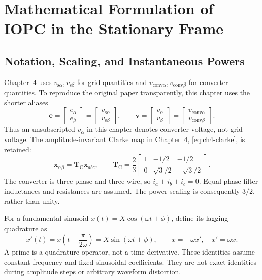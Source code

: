\section{Mathematical Formulation of IOPC in the Stationary Frame}
\label{sec:ch5-iopc}
\subsection{Notation, Scaling, and Instantaneous Powers}
Chapter~4 uses $v_{\mathrm{s}\alpha},v_{\mathrm{s}\beta}$ for grid quantities and $v_{\mathrm{conv}\alpha},v_{\mathrm{conv}\beta}$ for converter quantities. To reproduce the original paper transparently, this chapter uses the shorter aliases
\begin{equation}
\mathbf e=\begin{bmatrix}e_\alpha\\e_\beta\end{bmatrix}
=\begin{bmatrix}v_{\mathrm{s}\alpha}\\v_{\mathrm{s}\beta}\end{bmatrix},\qquad
\mathbf v=\begin{bmatrix}v_\alpha\\v_\beta\end{bmatrix}
=\begin{bmatrix}v_{\mathrm{conv}\alpha}\\v_{\mathrm{conv}\beta}\end{bmatrix}.
\label{eq:ch5-aliases}
\end{equation}
Thus an unsubscripted $v_\alpha$ in this chapter denotes converter voltage, not grid voltage. The amplitude-invariant Clarke map in Chapter~4, \eqref{eq:ch4-clarke}, is retained:
\begin{equation}
\mathbf x_{\alpha\beta}=\mathbf T_{\mathrm C}\mathbf x_{abc},\qquad
\mathbf T_{\mathrm C}=\frac23
\begin{bmatrix}1&-1/2&-1/2\\0&\sqrt3/2&-\sqrt3/2\end{bmatrix}.
\label{eq:ch5-clarke}
\end{equation}
The converter is three-phase and three-wire, so $i_a+i_b+i_c=0$. Equal phase-filter inductances and resistances are assumed. The power scaling is consequently $3/2$, rather than unity.

For a fundamental sinusoid $x(t)=X\cos(\omega t+\phi)$, define its lagging quadrature as
\begin{equation}
x'(t)=x\!\left(t-\frac{\pi}{2\omega}\right)=X\sin(\omega t+\phi),\qquad
\dot x=-\omega x',\quad \dot x'=\omega x.
\label{eq:ch5-quadrature-definition}
\end{equation}
A prime is a quadrature operator, not a time derivative. These identities assume constant frequency and fixed sinusoidal coefficients. They are not exact identities during amplitude steps or arbitrary waveform distortion.

